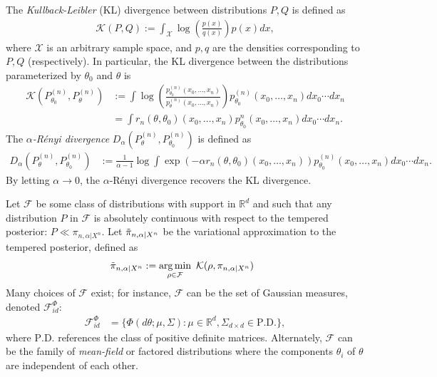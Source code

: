 \documentclass[11pt]{amsart}
\newcommand{\alpren}{$\alpha$-R\'enyi }
\newcommand{\malpharen}{D_{\alpha}(P^{(n)}_{\theta},P^{(n)}_{\theta_0})}
\newcommand{\datas}{x_0,\dots,x_n}
\newcommand{\kld}{ \mathcal{K}(P^{(n)}_{\theta_0},P^{(n)}_{\theta})}
\begin{document}
The\textit{ Kullback-Leibler} (KL) divergence between distributions $P,Q$ is defined as
\begin{align*}
    \mathcal{K}(P,Q) := \int_{\mathcal{X}} \log\left( \frac{p(x)}{q(x)}\right) p(x) dx,
\end{align*}
where $\mathcal{X}$ is an arbitrary sample space, and $p,q$ are the densities corresponding to $P,Q$ (respectively). In particular, the KL divergence between the distributions parameterized by $\theta_0$ and $\theta$ is
\begin{align}
    \nonumber
    \kld & := \int \log \left( \frac{p^{(n)}_{\theta_0}(\datas)}{p^{(n)}_{\theta}(\datas)} \right) p^{(n)}_{\theta_0}(\datas) dx_0 \cdots dx_n\\
    &= \int r_n(\theta,\theta_0)(\datas) p^n_{\theta_0}(\datas) dx_0 \cdots dx_n.
 \end{align}
%
The\textit{ $\alpha$-R\'enyi divergence} $\malpharen$ is defined as 
\begin{align}
    \malpharen & := %
    \frac{1}{\alpha-1} \log \int \exp\left(-\alpha r_n(\theta,\theta_0)(\datas)\right) p^{(n)}_{\theta_0}(\datas) dx_0 \cdots dx_n.
\end{align}
By letting $\alpha\to 0$, the \alpren divergence recovers the KL divergence. 

Let $\mathcal F$ be some class of distributions with support in $\mathbb R^d$ and such that any distribution $P$ in $\mathcal{F}$ is absolutely continuous with respect to the tempered posterior:
 $P \ll \pi_{n,\alpha|X^n}$. 
 Let $\Tilde{\pi}_{n,\alpha|X^n}$ be the variational approximation to the tempered posterior, defined as 
\begin{align}~\label{eq:vba}
    \Tilde{\pi}_{n,\alpha|X^n} & := \underset{\rho\in \mathcal{F}}{\arg \min} \enspace \mathcal{K}(\rho,\pi_{n,\alpha|X^n})%
\end{align}
Many choices of $\mathcal{F}$ exist; for instance, $\mathcal{F}$ can be the set of Gaussian measures, denoted $\mathcal{F}^{\Phi}_{id}$:
\begin{align}
	 \mathcal{F}^{\Phi}_{id} & = \{\Phi(d\theta;\mu,\Sigma): \mu\in \mathbb{R}^{d}, \Sigma_{d\times d} \in \text{P.D.}  \},
\end{align}
where $\text{P.D.}$ references the class of positive definite matrices. 
Alternately, $\mathcal{F}$ can be the family of {\em mean-field} or {factored distributions} where the components $\theta_i$ of $\theta$ are independent of each other. %
\end{document}
